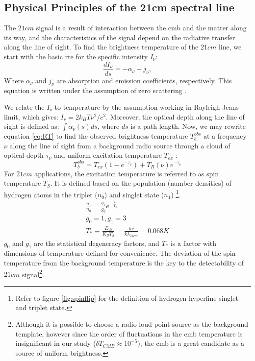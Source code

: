 \documentclass[12pt, TexShade, letterpaper]{report}
\begin{document}
\subsection{Physical Principles of the 21cm spectral line}
The $21cm$ signal is a result of interaction between the \gls{cmb} and the matter along its way, and the characteristics of the signal depend on the radiative transfer along the line of sight. To find the brightness temperature of the $21cm$ line, we start with the basic \gls{rte} for the specific intensity $I_{\nu}$:
\begin{equation}
    \frac{dI_\nu}{ds} = - \alpha_\nu + j_\nu ,
    \label{eq:RT}
\end{equation}
Where $\alpha_\nu$ and $j_\nu$ are absorption and emission coefficients, respectively. This equation is written under the assumption of zero scattering \cite{21century, low_frequency}. \par
We relate the $I_\nu$ to temperature by the assumption working in Rayleigh-Jeans limit, which gives: $I_\nu = 2k_B T \nu^2 /c^2$. Moreover, the optical depth along the line of sight is defined as: $\int \alpha_\nu \left(s\right) ds$, where $ds$ is a path length. Now, we may rewrite equation \ref{eq:RT} to find the observed brightness temperature $T^{obs}_b$ at a frequency $\nu$ along the line of sight from a background radio source through a cloud of optical depth $\tau_\nu$ and uniform excitation temperature $T_{ex}$ \cite{21century, low_frequency}:
\begin{equation}
    T^{obs}_b = T_{ex} \left(1-e^{-\tau_\nu} \right) + T_R \left (\nu \right) e ^{-\tau_\nu}
\end{equation}
For $21cm$ applications, the excitation temperature is referred to as spin temperature $T_S$. It is defined based on the population (number densities) of hydrogen atoms in the triplet ($n_0$) and singlet state ($n_1$) \footnote{Refer to figure \ref{fig:spinflip} for the definition of hydrogen hyperfine singlet and triplet state.}\cite{21century, low_frequency}.
\begin{gather}
    \frac{n_1}{n_0} = \frac{g_1}{g_0} e ^ {-\frac{T_*}{T_S}}\\
    g_0 =1, g_1 =3\\
     T_* \equiv \frac{E_{10}}{K_B T_S} = \frac {hc}{k\lambda_{21cm}} = 0.068 K
\end{gather}
$g_0$ and $g_1$ are the statistical degeneracy factors, and $T_*$ is a factor with dimensions of temperature defined for convenience. The deviation of the spin temperature from the background temperature is the key to the detectability of $21cm$ signal\footnote{Although it is possible to choose a radio-loud point source as the background template, however since the order of fluctuations in the \gls{cmb} temperature is insignificant in our study ($\delta T_{CMB} \approx 10 ^{-5}$), the \gls{cmb} is a great candidate as a source of uniform brightness\cite{21century}.}.\par
\end{document}
